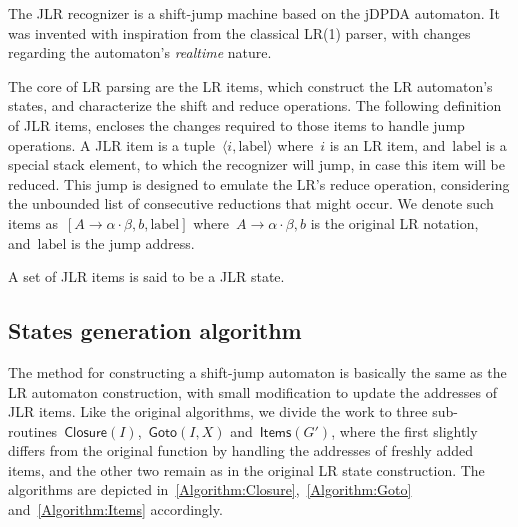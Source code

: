 \newcommand\StackLabel{\ensuremath{\textrm{label}}}
\def\function#1(#2){\ensuremath{\textsf{#1}(#2)}}
\def\table#1[#2]{\ensuremath{\textsf{#1}[#2]}}

The JLR recognizer is a shift-jump machine
  based on the jDPDA automaton.
It was invented with inspiration from the classical
  LR(1) parser, with changes regarding the automaton's
  \emph{realtime} nature.

The core of LR parsing are the LR items,
  which construct the LR automaton's states, and
  characterize the shift and reduce operations.
The following definition of JLR items,
  encloses the changes required to those items to handle
  jump operations.
A JLR item is a tuple~$⟨i,\StackLabel⟩$ where~$i$ is an
  LR item, and~$\StackLabel$ is a special stack element,
  to which the recognizer will jump, in case this item will
  be reduced.
This jump is designed to emulate the LR's
  reduce operation, considering the unbounded list of consecutive
  reductions that might occur.
We denote such items as~$[A→α·β, b , \StackLabel]$
  where~$A→α·β, b$ is the original LR notation, and~$\StackLabel$
  is the jump address.

A set of JLR items is said to be a JLR state.

\subsection{States generation algorithm}
The method for constructing a shift-jump automaton
  is basically the same as the LR automaton construction,
  with small modification to update the addresses of JLR items.
Like the original algorithms, we divide the work to three
  sub-routines~$\function Closure(I)$,~$\function Goto(I,X)$ and~$\function Items(G')$,
  where the first slightly differs from the original function by handling the
  addresses of freshly added items, and the other two remain as in the original
  LR state construction.
The algorithms are depicted in~\cref{Algorithm:Closure},~\cref{Algorithm:Goto}
  and~\cref{Algorithm:Items} accordingly.

\newcommand\INPUT\REQUIRE
\newcommand\OUTPUT\ENSURE
\renewcommand{\LET}[2]{\STATE{\textbf{Let} \ensuremath{\text{#1}←\text{#2}}}}
\renewcommand{\algorithmicrequire}{\textbf{Input}}
\renewcommand{\algorithmicensure}{\textbf{Output}}

